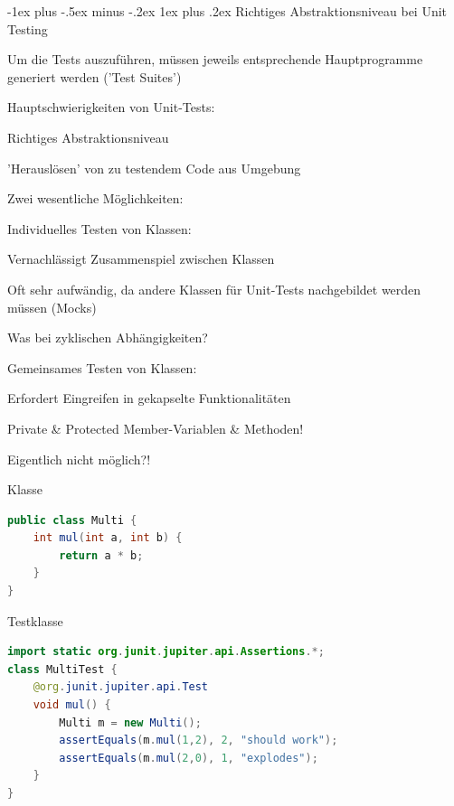 \documentclass[10pt]{article}
\makeatletter
\renewcommand{\subsubsection}{\@startsection{subsubsection}{3}{0mm}%
                                {-1ex plus -.5ex minus -.2ex}%
                                {1ex plus .2ex}%
                                {\normalfont\small\bfseries}}
\makeatother
\begin{document}
\subsubsection{Richtiges Abstraktionsniveau bei Unit Testing}
\begin{itemize*}
  \item Um die Tests auszuführen, müssen jeweils entsprechende Hauptprogramme generiert werden ('Test Suites')
  \item Hauptschwierigkeiten von Unit-Tests:
  \begin{itemize*}
    \item Richtiges Abstraktionsniveau
    \item 'Herauslösen' von zu testendem Code aus Umgebung
  \end{itemize*}
  \item Zwei wesentliche Möglichkeiten:
  \begin{itemize*}
    \item Individuelles Testen von Klassen:
    \begin{itemize*}
      \item Vernachlässigt Zusammenspiel zwischen Klassen
      \item Oft sehr aufwändig, da andere Klassen für Unit-Tests nachgebildet werden müssen (Mocks)
      \item Was bei zyklischen Abhängigkeiten?
    \end{itemize*}
    \item Gemeinsames Testen von Klassen:
    \begin{itemize*}
      \item Erfordert Eingreifen in gekapselte Funktionalitäten
      \item Private \& Protected Member-Variablen \& Methoden!
      \item Eigentlich nicht möglich?!
    \end{itemize*}
  \end{itemize*}
\end{itemize*}

Klasse
\begin{lstlisting}[language=java]
public class Multi {
    int mul(int a, int b) {
        return a * b;
    }
}
\end{lstlisting}

Testklasse
\begin{lstlisting}[language=java]
import static org.junit.jupiter.api.Assertions.*;
class MultiTest {
    @org.junit.jupiter.api.Test
    void mul() {
        Multi m = new Multi();
        assertEquals(m.mul(1,2), 2, "should work");
        assertEquals(m.mul(2,0), 1, "explodes");
    }
}
\end{lstlisting}
\end{document}
